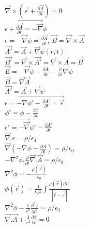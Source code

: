 \documentclass{article}
\begin{document}
$\vec{\nabla}\times
\left(\vec{\epsilon}+\frac{\partial\vec{A}}{\partial t}\right)=0$\\

$\vec{\epsilon+\frac{\partial\vec{A}}{\partial t}=-\vec{\nabla}}\phi$\\

$\epsilon=-\vec{\nabla}\phi=\frac{\partial\vec{A}}{\partial t}$, $\vec{B}=\vec{\nabla}\times\vec{A}$\\

$\vec{A'}=\vec{A}+\vec{\nabla}\psi(r,t)$\\

$\vec{B'}=\vec{\nabla}\times\vec{A'}=\vec{\nabla}\times \vec{A}=\vec{B}$\\

$\vec{E}=-\vec{\nabla}\phi-\frac{\partial A}{\partial t}-\frac{\partial}{\partial t}\nabla
\psi$\\

$\vec{B}=\vec{\nabla}\vec{A}$\\

$\vec{A'}=\vec{A}+\vec{\nabla}\psi$\\

$\vec{\epsilon=-\nabla\phi'-\frac{\partial A'}{\partial t}=\vec{\epsilon}}$\\

$\phi'=\phi-\frac{\partial \psi}{\partial t}$\\

$\vec{\epsilon'=-\vec{\nabla}}\phi'-\frac{\partial A'}{\partial t}$\\

$\vec{\nabla}.\epsilon=\rho/\epsilon_{0}$\\

$\vec{\nabla}\left(-\nabla\phi-\frac{\partial A}{\partial t}\right)=\rho/\epsilon_{0}$\\

$-\nabla^{2}\phi.\frac{\partial}{\partial t}\vec{\nabla}.\vec{A}=\rho/\epsilon_{0}$\\

$\nabla^{2}\phi=-\frac{\rho(\vec{r})}{\epsilon_{0}}$\\

$\phi(\vec{r})=\frac{1}{\epsilon_{0}\pi}\int\frac{\rho(\vec{r})dv'}{|\vec{r}-\vec{r'}|}$\\

$\nabla^{2}\phi-\frac{1}{c^{2}}\frac{\partial^{2}\phi}{\partial t^{2}}=\rho/\epsilon_{0}$\\

$\vec{\nabla}.\vec{A}+\frac{1}{c^{2}}\frac{\partial
\phi}{\partial t}=0$
\end{document}

